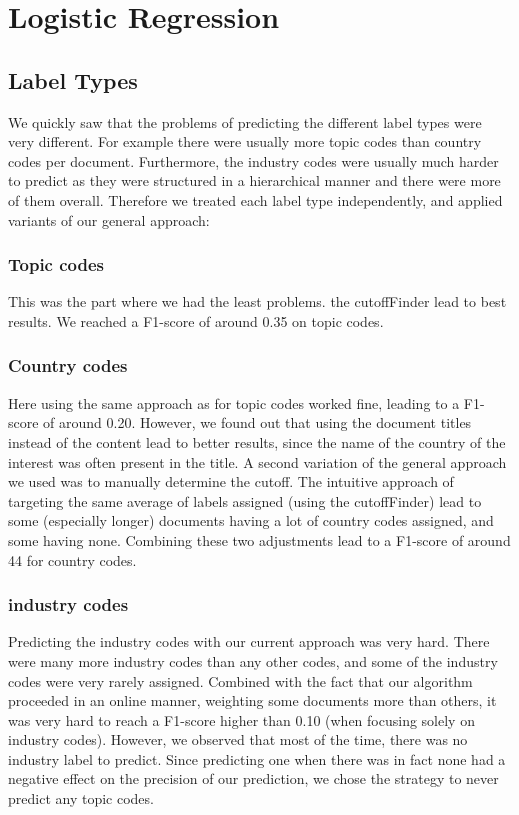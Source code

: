 \documentclass{article}
\begin{document}
\section*{Logistic Regression}
\subsection{Label Types}
        We quickly saw that the problems of predicting the different label types were very different. For example there were usually more topic codes than  country codes per document. Furthermore, the industry codes were usually much harder to predict as they were structured in a hierarchical manner and there were more of them overall. Therefore we treated each label type independently, and applied variants of our general approach:
            \subsubsection{ Topic codes}
                This was the part where we had the least problems. the cutoffFinder lead to best results.  We reached a F1-score of around 0.35 on topic codes.

            \subsubsection{ Country codes }
                Here using the same approach as for topic codes worked fine, leading to a F1-score of around 0.20. However, we found out that using the document titles instead of the content lead to better results, since the name of the country of the interest was often present in the title. A second variation of the general approach we used was to manually determine the cutoff. The intuitive approach of targeting the same average of labels assigned (using the cutoffFinder) lead to some (especially longer) documents having a lot of country codes assigned, and some having none.
                    Combining these two adjustments lead to a F1-score of around 44 for country codes.


            \subsubsection{industry codes }
            Predicting the industry codes with our current approach was very hard. There were many more industry codes than any other codes, and some of the industry codes were very rarely assigned.  Combined with the fact that our algorithm proceeded in an online manner, weighting some documents more than others, it was very hard to reach a F1-score higher than 0.10 (when focusing solely on industry codes). However, we observed that most of the time, there was no industry label to predict. Since predicting one when there was in fact none had a negative effect on the precision of our prediction, we chose the strategy to never predict any topic codes.
\end{document}
